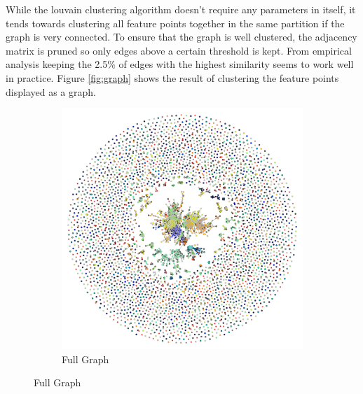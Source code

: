 \documentclass[conference]{IEEEtran}
\begin{document}
While the louvain clustering algorithm doesn't require any parameters in 
itself, it tends towards clustering all feature points together in the 
same partition if the graph is very connected.  To ensure that the graph 
is well clustered, the adjacency matrix is pruned so only edges above a 
certain threshold is kept. From empirical analysis keeping the 2.5\% of 
edges with the highest similarity seems to work well in practice. Figure 
\ref{fig:graph} shows the result of clustering the feature points 
displayed as a graph.
%
\begin{figure}
	\centering
	\begin{subfigure}[t]{0.45\textwidth}
		\includegraphics[width=\textwidth]{images/MMC_graph_full}
		\caption{Full Graph}
		\label{fig:full_graph}
	\end{subfigure}%


\end{figure}
\end{document}
